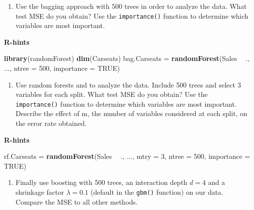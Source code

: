 \documentclass[]{article}
\newenvironment{Shaded}{\begin{snugshade}}{\end{snugshade}}
\newcommand{\DataTypeTok}[1]{\textcolor[rgb]{0.13,0.29,0.53}{#1}}
\newcommand{\DecValTok}[1]{\textcolor[rgb]{0.00,0.00,0.81}{#1}}
\newcommand{\KeywordTok}[1]{\textcolor[rgb]{0.13,0.29,0.53}{\textbf{#1}}}
\newcommand{\NormalTok}[1]{#1}
\newcommand{\OperatorTok}[1]{\textcolor[rgb]{0.81,0.36,0.00}{\textbf{#1}}}
\newcommand{\OtherTok}[1]{\textcolor[rgb]{0.56,0.35,0.01}{#1}}
\newcommand{\StringTok}[1]{\textcolor[rgb]{0.31,0.60,0.02}{#1}}
\providecommand{\tightlist}{%
  \setlength{\itemsep}{0pt}\setlength{\parskip}{0pt}}
\begin{document}
\begin{enumerate}
\def\labelenumi{\alph{enumi})}
\setcounter{enumi}{3}
\tightlist
\item
  Use the bagging approach with 500 trees in order to analyze the data.
  What test MSE do you obtain? Use the \texttt{importance()} function to
  determine which variables are most important.
\end{enumerate}

\textbf{R-hints}

\begin{Shaded}
\begin{Highlighting}[]
\KeywordTok{library}\NormalTok{(randomForest)}
\KeywordTok{dim}\NormalTok{(Carseats)}
\NormalTok{bag.Carseats =}\StringTok{ }\KeywordTok{randomForest}\NormalTok{(Sales }\OperatorTok{~}\StringTok{ }\NormalTok{., ..., }\DataTypeTok{ntree =} \DecValTok{500}\NormalTok{, }\DataTypeTok{importance =} \OtherTok{TRUE}\NormalTok{)}
\end{Highlighting}
\end{Shaded}

\begin{enumerate}
\def\labelenumi{\alph{enumi})}
\setcounter{enumi}{4}
\tightlist
\item
  Use random forests and to analyze the data. Include 500 trees and
  select 3 variables for each split. What test MSE do you obtain? Use
  the \texttt{importance()} function to determine which variables are
  most important. Describe the effect of m, the number of variables
  considered at each split, on the error rate obtained.
\end{enumerate}

\textbf{R-hints}

\begin{Shaded}
\begin{Highlighting}[]
\NormalTok{rf.Carseats =}\StringTok{ }\KeywordTok{randomForest}\NormalTok{(Sales }\OperatorTok{~}\StringTok{ }\NormalTok{., ..., }\DataTypeTok{mtry =} \DecValTok{3}\NormalTok{, }\DataTypeTok{ntree =} \DecValTok{500}\NormalTok{, }\DataTypeTok{importance =} \OtherTok{TRUE}\NormalTok{)}
\end{Highlighting}
\end{Shaded}

\begin{enumerate}
\def\labelenumi{\alph{enumi})}
\setcounter{enumi}{5}
\tightlist
\item
  Finally use boosting with 500 trees, an interaction depth \(d=4\) and
  a shrinkage factor \(\lambda=0.1\) (default in the \texttt{gbm()}
  function) on our data. Compare the MSE to all other methods.
\end{enumerate}
\end{document}
